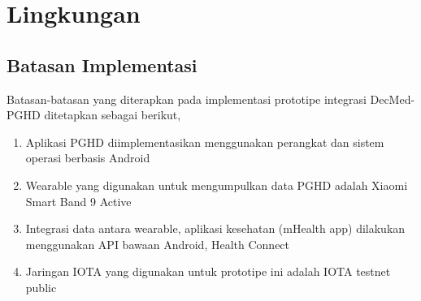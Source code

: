\section{Lingkungan}

\subsection{Batasan Implementasi}

Batasan-batasan yang diterapkan pada implementasi prototipe integrasi DecMed-PGHD ditetapkan sebagai berikut,

\begin{enumerate}
    \item Aplikasi PGHD diimplementasikan menggunakan perangkat dan sistem operasi berbasis Android
    \item Wearable yang digunakan untuk mengumpulkan data PGHD adalah Xiaomi Smart Band 9 Active
    \item Integrasi data antara wearable, aplikasi kesehatan (mHealth app) dilakukan menggunakan API bawaan Android, Health Connect
    \item Jaringan IOTA yang digunakan untuk prototipe ini adalah IOTA testnet public 
\end{enumerate}